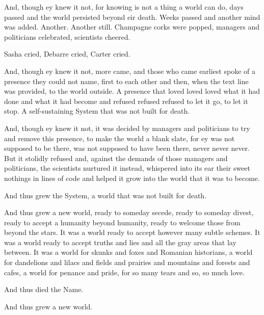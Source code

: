 And, though ey knew it not, for knowing is not a thing a world can do, days passed and the world persisted beyond eir death. Weeks passed and another mind was added. Another. Another still. Champagne corks were popped, managers and politicians celebrated, scientists cheered.

Sasha cried, Debarre cried, Carter cried.

And, though ey knew it not, more came, and those who came earliest spoke of a presence they could not name, first to each other and then, when the text line was provided, to the world outside. A presence that loved loved loved what it had done and what it had become and refused refused refused to let it go, to let it stop. A self-sustaining System that was not built for death.

And, though ey knew it not, it was decided by managers and politicians to try and remove this presence, to make the world a blank slate, for ey was not supposed to be there, was not supposed to have been there, never never never. But it stolidly refused and, against the demands of those managers and politicians, the scientists nurtured it instead, whispered into its ear their sweet nothings in lines of code and helped it grow into the world that it was to become.

And thus grew the System, a world that was not built for death.

And thus grew a new world, ready to someday secede, ready to someday divest, ready to accept a humanity beyond humanity, ready to welcome those from beyond the stars. It was a world ready to accept however many subtle schemes. It was a world ready to accept truths and lies and all the gray areas that lay between. It was a world for skunks and foxes and Romanian historians, a world for dandelions and lilacs and fields and prairies and mountains and forests and cafes, a world for penance and pride, for so many tears and so, so much love.

And thus died the Name.

And thus grew a new world.
